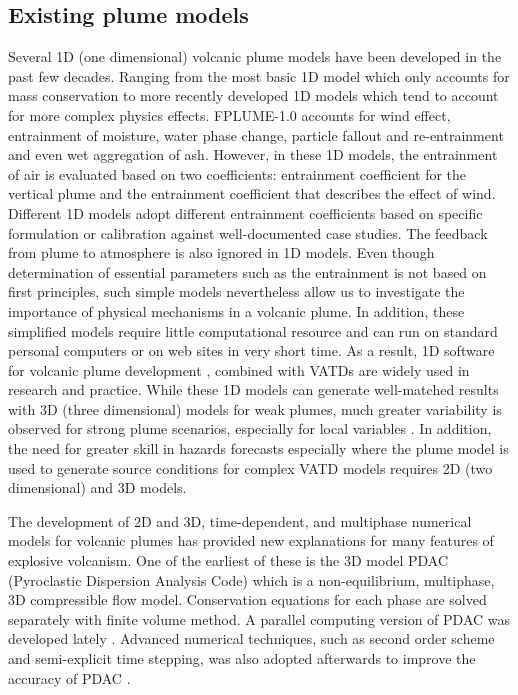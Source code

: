 \documentclass[journal abbreviation, manuscript]{copernicus}
\begin{document}
\subsection{Existing plume models}
Several 1D (one dimensional) volcanic plume models have been developed in the past few decades. Ranging from the most basic 1D model \citep{woods1988fluid} which only accounts for mass conservation to more recently developed 1D models  \citep{bursik2001effect, mastin2007user, degruyter2012improving, woodhouse2013interaction, devenish2013using, de2015plume, folch2016fplume, pouget2016sensitivity} which tend to account for more complex physics effects. FPLUME-1.0 \citep{folch2016fplume} accounts for wind effect, entrainment of moisture, water phase change, particle fallout and re-entrainment and even wet aggregation of ash. However, in these 1D models, the entrainment of air is evaluated based on two coefficients: entrainment coefficient for the vertical plume and the entrainment coefficient that describes the effect of wind. Different 1D models adopt different entrainment coefficients based on specific formulation or calibration against well-documented case studies. The feedback from plume to atmosphere is also ignored in 1D models. Even though determination of essential parameters such as the entrainment is not based on first principles, such simple models nevertheless allow us to investigate the importance of physical mechanisms in a volcanic plume. In addition, these simplified models require little computational resource and can run on standard personal computers or on web sites in very short time. As a result, 1D software for volcanic plume development \citep[such as][]{267, 1194, 3541}, combined with VATDs \citep[such as][]{114, draxler2015hysplit} are widely used in research and practice. While these 1D models can generate well-matched results with 3D (three dimensional) models for weak plumes, much greater variability is observed for strong plume scenarios, especially for local variables \citep{costa2016results}. In addition, the need for greater skill in hazards forecasts especially where the plume model is used to generate source conditions for complex VATD models requires 2D (two dimensional) and 3D models.

The development of 2D and 3D, time-dependent, and multiphase numerical models for volcanic plumes has provided new explanations for many features of explosive volcanism. One of the earliest of these is the 3D model PDAC (Pyroclastic Dispersion Analysis Code) \citep{neri2003multiparticle}  which is a non-equilibrium, multiphase, 3D compressible flow model. Conservation equations for each phase are solved separately with finite volume method. A parallel computing version of PDAC was developed lately \citep{ongaro2007parallel}. Advanced numerical techniques, such as second order scheme and semi-explicit time stepping, was also adopted afterwards to improve the accuracy of PDAC \citep{carcano2013semi}. 
\end{document}
